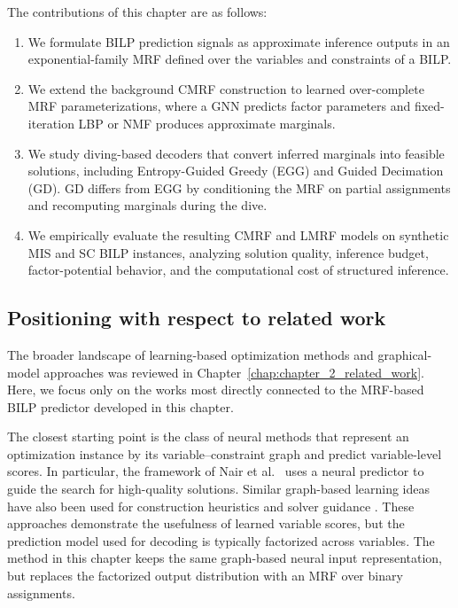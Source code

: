The contributions of this chapter are as follows:
\begin{enumerate}
    \item We formulate BILP prediction signals as approximate inference outputs in an exponential-family MRF defined over the variables and constraints of a BILP.

    \item We extend the background CMRF construction to learned over-complete MRF parameterizations, where a GNN predicts factor parameters and fixed-iteration LBP or NMF produces approximate marginals.

    \item We study diving-based decoders that convert inferred marginals into feasible solutions, including Entropy-Guided Greedy (EGG) and Guided Decimation (GD). GD differs from EGG by conditioning the MRF on partial assignments and recomputing marginals during the dive.

    \item We empirically evaluate the resulting CMRF and LMRF models on synthetic MIS and SC BILP instances, analyzing solution quality, inference budget, factor-potential behavior, and the computational cost of structured inference.
\end{enumerate}

\subsection{Positioning with respect to related work}

The broader landscape of learning-based optimization methods and graphical-model approaches was reviewed in Chapter~\ref{chap:chapter_2_related_work}.
Here, we focus only on the works most directly connected to the MRF-based BILP predictor developed in this chapter.

The closest starting point is the class of neural methods that represent an optimization instance by its variable--constraint graph and predict variable-level scores. In particular, the framework of Nair et al.~\cite{nair_solving_2020} uses a neural predictor to guide the search for high-quality solutions. Similar graph-based learning ideas have also been used for construction heuristics and solver guidance \cite{dai_learning_2017,gasse_exact_2019}. These approaches demonstrate the usefulness of learned variable scores, but the prediction model used for decoding is typically factorized across variables. The method in this chapter keeps the same graph-based neural input representation, but replaces the factorized output distribution with an MRF over binary assignments.

